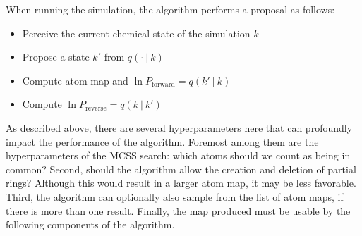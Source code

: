 %
When running the simulation, the algorithm performs a proposal as follows:
\begin{itemize}
    \item Perceive the current chemical state of the simulation $k$
    \item Propose a state $k'$ from $q(\cdot~|~k)$
    \item Compute atom map and $\ln P_\mathrm{forward} = q(k'~|~k)$
    \item Compute $\ln P_\mathrm{reverse} = q(k~|~k')$
\end{itemize}
%
As described above, there are several hyperparameters here that can profoundly impact the performance of the algorithm. 
%
Foremost among them are the hyperparameters of the MCSS search: which atoms should we count as being in common?
%
Second, should the algorithm allow the creation and deletion of partial rings?
%
Although this would result in a larger atom map, it may be less favorable.
%
Third, the algorithm can optionally also sample from the list of atom maps, if there is more than one result.
%
Finally, the map produced must be usable by the following components of the algorithm.
%
